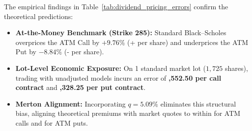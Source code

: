 The empirical findings in Table~\ref{tab:dividend_pricing_errors} confirm the theoretical predictions:
\begin{itemize}[leftmargin=1.5em, itemsep=1pt, parsep=0pt]
    \item \textbf{At-the-Money Benchmark (Strike 285):} Standard Black--Scholes overprices the ATM Call by $+9.76\%$ (+ per share) and underprices the ATM Put by $-8.84\%$ (- per share).
    \item \textbf{Lot-Level Economic Exposure:} On 1 standard market lot ($1,725$ shares), trading with unadjusted models incurs an error of \textbf{,552.50 per call contract} and \textbf{,328.25 per put contract}.
    \item \textbf{Merton Alignment:} Incorporating $q = 5.09\%$ eliminates this structural bias, aligning theoretical premiums with market quotes to within  for ATM calls and  for ATM puts.
\end{itemize}

\clearpage
